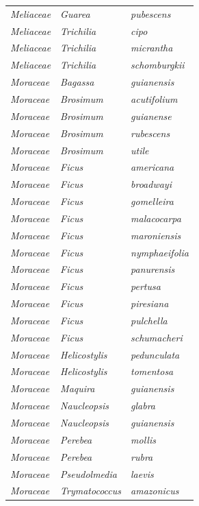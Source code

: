 \documentclass[fleqn,10pt]{ArtEcoFoG} %
\begin{document}
\begin{table}[t]
\begin{tabular}{lll}
\em{Meliaceae} & \em{Guarea} & \em{pubescens}\\
\em{Meliaceae} & \em{Trichilia} & \em{cipo}\\
\em{Meliaceae} & \em{Trichilia} & \em{micrantha}\\
\em{Meliaceae} & \em{Trichilia} & \em{schomburgkii}\\
\em{Moraceae} & \em{Bagassa} & \em{guianensis}\\
\addlinespace
\em{Moraceae} & \em{Brosimum} & \em{acutifolium}\\
\em{Moraceae} & \em{Brosimum} & \em{guianense}\\
\em{Moraceae} & \em{Brosimum} & \em{rubescens}\\
\em{Moraceae} & \em{Brosimum} & \em{utile}\\
\em{Moraceae} & \em{Ficus} & \em{americana}\\
\addlinespace
\em{Moraceae} & \em{Ficus} & \em{broadwayi}\\
\em{Moraceae} & \em{Ficus} & \em{gomelleira}\\
\em{Moraceae} & \em{Ficus} & \em{malacocarpa}\\
\em{Moraceae} & \em{Ficus} & \em{maroniensis}\\
\em{Moraceae} & \em{Ficus} & \em{nymphaeifolia}\\
\addlinespace
\em{Moraceae} & \em{Ficus} & \em{panurensis}\\
\em{Moraceae} & \em{Ficus} & \em{pertusa}\\
\em{Moraceae} & \em{Ficus} & \em{piresiana}\\
\em{Moraceae} & \em{Ficus} & \em{pulchella}\\
\em{Moraceae} & \em{Ficus} & \em{schumacheri}\\
\addlinespace
\em{Moraceae} & \em{Helicostylis} & \em{pedunculata}\\
\em{Moraceae} & \em{Helicostylis} & \em{tomentosa}\\
\em{Moraceae} & \em{Maquira} & \em{guianensis}\\
\em{Moraceae} & \em{Naucleopsis} & \em{glabra}\\
\em{Moraceae} & \em{Naucleopsis} & \em{guianensis}\\
\addlinespace
\em{Moraceae} & \em{Perebea} & \em{mollis}\\
\em{Moraceae} & \em{Perebea} & \em{rubra}\\
\em{Moraceae} & \em{Pseudolmedia} & \em{laevis}\\
\em{Moraceae} & \em{Trymatococcus} & \em{amazonicus}\\

\end{tabular}
\end{table}
\end{document}
